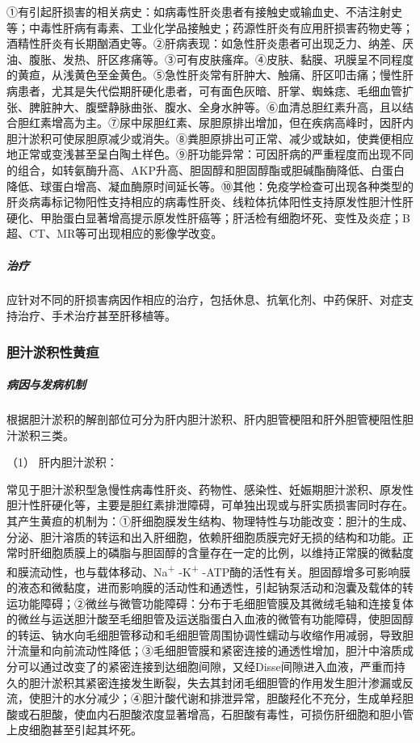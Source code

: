 ①有引起肝损害的相关病史：如病毒性肝炎患者有接触史或输血史、不洁注射史等；中毒性肝病有毒素、工业化学品接触史；药源性肝炎有应用肝损害药物史等；酒精性肝炎有长期酗酒史等。②肝病表现：如急性肝炎患者可出现乏力、纳差、厌油、腹胀、发热、肝区疼痛等。③可有皮肤瘙痒。④皮肤、黏膜、巩膜呈不同程度的黄疸，从浅黄色至金黄色。⑤急性肝炎常有肝肿大、触痛、肝区叩击痛；慢性肝病患者，尤其是失代偿期肝硬化患者，可有面色灰暗、肝掌、蜘蛛痣、毛细血管扩张、脾脏肿大、腹壁静脉曲张、腹水、全身水肿等。⑥血清总胆红素升高，且以结合胆红素增高为主。⑦尿中尿胆红素、尿胆原排出增加，但在疾病高峰时，因肝内胆汁淤积可使尿胆原减少或消失。⑧粪胆原排出可正常、减少或缺如，使粪便相应地正常或变浅甚至呈白陶土样色。⑨肝功能异常：可因肝病的严重程度而出现不同的组合，如转氨酶升高、AKP升高、胆固醇和胆固醇酯或胆碱酯酶降低、白蛋白降低、球蛋白增高、凝血酶原时间延长等。⑩其他：免疫学检查可出现各种类型的肝炎病毒标记物阳性支持相应的病毒性肝炎、线粒体抗体阳性支持原发性胆汁性肝硬化、甲胎蛋白显著增高提示原发性肝癌等；肝活检有细胞坏死、变性及炎症；B超、CT、MR等可出现相应的影像学改变。

\subparagraph{治疗}

应针对不同的肝损害病因作相应的治疗，包括休息、抗氧化剂、中药保肝、对症支持治疗、手术治疗甚至肝移植等。

\subsubsection{胆汁淤积性黄疸}

\subparagraph{病因与发病机制}

根据胆汁淤积的解剖部位可分为肝内胆汁淤积、肝内胆管梗阻和肝外胆管梗阻性胆汁淤积三类。

\hypertarget{text00039.htmlux5cux23CHP1-16-4-4-1-1}{}
（1） 肝内胆汁淤积：

常见于胆汁淤积型急慢性病毒性肝炎、药物性、感染性、妊娠期胆汁淤积、原发性胆汁性肝硬化等，主要是胆红素排泄障碍，可单独出现或与肝实质损害同时存在。其产生黄疸的机制为：①肝细胞膜发生结构、物理特性与功能改变：胆汁的生成、分泌、胆汁溶质的转运和出入肝细胞，依赖肝细胞质膜完好无损的结构和功能。正常时肝细胞质膜上的磷脂与胆固醇的含量存在一定的比例，以维持正常膜的微黏度和膜流动性，也与载体移动、Na\textsuperscript{+}
-K\textsuperscript{+}
-ATP酶的活性有关。胆固醇增多可影响膜的液态和微黏度，进而影响膜的活动性和通透性，引起钠泵活动和泡囊及载体的转运功能障碍；②微丝与微管功能障碍：分布于毛细胆管膜及其微绒毛轴和连接复体的微丝与运送胆汁酸至毛细胆管及运送脂蛋白入血液的微管有功能障碍，使胆固醇的转运、钠水向毛细胆管移动和毛细胆管周围协调性蠕动与收缩作用减弱，导致胆汁流量和向前流动性降低；③毛细胆管膜和紧密连接的通透性增加，胆汁中溶质成分可以通过改变了的紧密连接到达细胞间隙，又经Disse间隙进入血液，严重而持久的胆汁淤积其紧密连接发生断裂，失去其封闭毛细胆管的作用发生胆汁渗漏或反流，使胆汁的水分减少；④胆汁酸代谢和排泄异常，胆酸羟化不充分，生成单羟胆酸或石胆酸，使血内石胆酸浓度显著增高，石胆酸有毒性，可损伤肝细胞和胆小管上皮细胞甚至引起其坏死。

